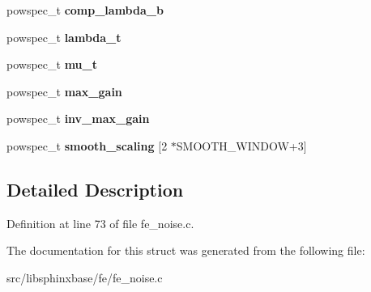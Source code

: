 \begin{DoxyCompactItemize}
\item 
powspec\-\_\-t {\bfseries comp\-\_\-lambda\-\_\-b}\label{structnoise__stats__s_ac3317afbf629cadc04b41c5657f0140d}

\item 
powspec\-\_\-t {\bfseries lambda\-\_\-t}\label{structnoise__stats__s_a94d5961c9df8d3345821c2f6c4358514}

\item 
powspec\-\_\-t {\bfseries mu\-\_\-t}\label{structnoise__stats__s_ad5cc76a830669ea5fbf0b8f4e4f80652}

\item 
powspec\-\_\-t {\bfseries max\-\_\-gain}\label{structnoise__stats__s_afeda1bf01ce753f6b3e4fb89279cfc63}

\item 
powspec\-\_\-t {\bfseries inv\-\_\-max\-\_\-gain}\label{structnoise__stats__s_ab6b62f1324e05bafa461bdcab8bc1bf3}

\item 
powspec\-\_\-t {\bfseries smooth\-\_\-scaling} [2 $\ast$S\-M\-O\-O\-T\-H\-\_\-\-W\-I\-N\-D\-O\-W+3]\label{structnoise__stats__s_a4bc8cd91479f20703fdf82251ba90e6e}

\end{DoxyCompactItemize}


\subsection{Detailed Description}


Definition at line 73 of file fe\-\_\-noise.\-c.



The documentation for this struct was generated from the following file\-:\begin{DoxyCompactItemize}
\item 
src/libsphinxbase/fe/fe\-\_\-noise.\-c\end{DoxyCompactItemize}
